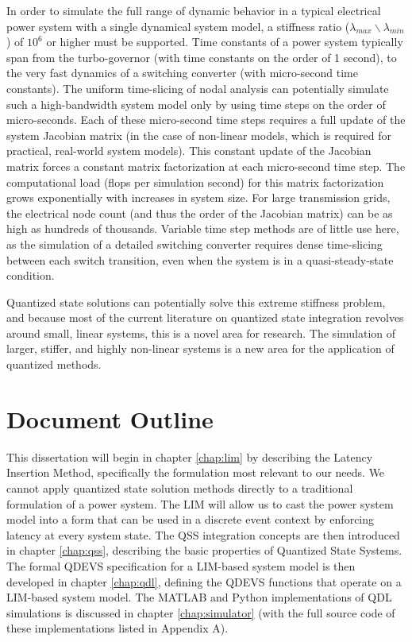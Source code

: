 In order to simulate the full range of dynamic behavior in a typical electrical power system with a single dynamical system model, a stiffness ratio ($\lambda_{max} \backslash \lambda_{min}$) of $10^6$ or higher must be supported. Time constants of a power system typically span from the turbo-governor (with time constants on the order of 1 second), to the very fast dynamics of a switching converter (with micro-second time constants). The uniform time-slicing of nodal analysis can potentially simulate such a high-bandwidth system model only by using time steps on the order of micro-seconds. Each of these micro-second time steps requires a full update of the system Jacobian matrix (in the case of non-linear models, which is required for practical, real-world system models). This constant update of the Jacobian matrix forces a constant matrix factorization at each micro-second time step. The computational load (flops per simulation second) for this matrix factorization grows exponentially with increases in system size. For large transmission grids, the electrical node count (and thus the order of the Jacobian matrix) can be as high as hundreds of thousands. Variable time step methods are of little use here, as the simulation of a detailed switching converter requires dense time-slicing between each switch transition, even when the system is in a quasi-steady-state condition.

Quantized state solutions can potentially solve this extreme stiffness problem, and because most of the current literature on quantized state integration revolves around small, linear systems, this is a novel area for research. The simulation of larger, stiffer, and highly non-linear systems is a new area for the application of quantized methods.

\section{Document Outline}

This dissertation will begin in chapter \ref{chap:lim} by describing the Latency Insertion Method, specifically the formulation most relevant to our needs. We cannot apply quantized state solution methods directly to a traditional formulation of a power system. The LIM will allow us to cast the power system model into a form that can be used in a discrete event context by enforcing latency at every system state. The QSS integration concepts are then introduced in chapter \ref{chap:qss}, describing the basic properties of Quantized State Systems. The formal QDEVS specification for a LIM-based system model is then developed in chapter \ref{chap:qdl}, defining the QDEVS functions that operate on a LIM-based system model. The MATLAB and Python implementations of QDL simulations is discussed in chapter \ref{chap:simulator} (with the full source code of these implementations listed in Appendix A).

